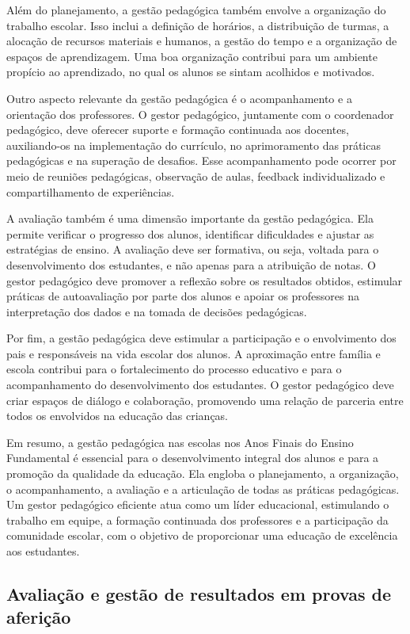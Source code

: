 Além do planejamento, a gestão pedagógica também envolve a organização
do trabalho escolar. Isso inclui a definição de horários, a distribuição
de turmas, a alocação de recursos materiais e humanos, a gestão do tempo
e a organização de espaços de aprendizagem. Uma boa organização
contribui para um ambiente propício ao aprendizado, no qual os alunos se
sintam acolhidos e motivados.

Outro aspecto relevante da gestão pedagógica é o acompanhamento e a
orientação dos professores. O gestor pedagógico, juntamente com o
coordenador pedagógico, deve oferecer suporte e formação continuada aos
docentes, auxiliando-os na implementação do currículo, no aprimoramento
das práticas pedagógicas e na superação de desafios. Esse acompanhamento
pode ocorrer por meio de reuniões pedagógicas, observação de aulas,
feedback individualizado e compartilhamento de experiências.

A avaliação também é uma dimensão importante da gestão pedagógica. Ela
permite verificar o progresso dos alunos, identificar dificuldades e
ajustar as estratégias de ensino. A avaliação deve ser formativa, ou
seja, voltada para o desenvolvimento dos estudantes, e não apenas para a
atribuição de notas. O gestor pedagógico deve promover a reflexão sobre
os resultados obtidos, estimular práticas de autoavaliação por parte dos
alunos e apoiar os professores na interpretação dos dados e na tomada de
decisões pedagógicas.

Por fim, a gestão pedagógica deve estimular a participação e o
envolvimento dos pais e responsáveis na vida escolar dos alunos. A
aproximação entre família e escola contribui para o fortalecimento do
processo educativo e para o acompanhamento do desenvolvimento dos
estudantes. O gestor pedagógico deve criar espaços de diálogo e
colaboração, promovendo uma relação de parceria entre todos os
envolvidos na educação das crianças.

Em resumo, a gestão pedagógica nas escolas nos Anos Finais do Ensino
Fundamental é essencial para o desenvolvimento integral dos alunos e
para a promoção da qualidade da educação. Ela engloba o planejamento, a
organização, o acompanhamento, a avaliação e a articulação de todas as
práticas pedagógicas. Um gestor pedagógico eficiente atua como um líder
educacional, estimulando o trabalho em equipe, a formação continuada dos
professores e a participação da comunidade escolar, com o objetivo de
proporcionar uma educação de excelência aos estudantes.

\subsection{Avaliação e gestão de resultados em provas de
aferição}\label{avaliauxe7uxe3o-e-gestuxe3o-de-resultados-em-provas-de-aferiuxe7uxe3o}

